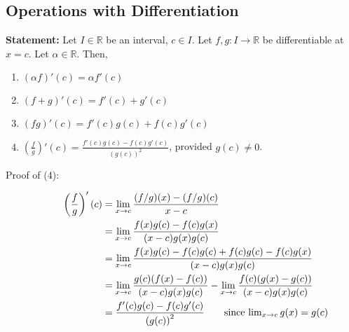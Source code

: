 \documentclass[10pt]{extarticle}
\newcommand{\R}{\mathbb{R}}
\begin{document}
  \subsection{Operations with Differentiation}%
    \textbf{Statement:} Let $I\in\R$ be an interval, $c\in I$. Let $f,g: I\rightarrow \R$ be differentiable at $x=c$. Let $\alpha\in\R$. Then,
    \begin{enumerate}[(1)]
      \item $\displaystyle(\alpha f)'(c) = \alpha f'(c)$
      \item $\displaystyle(f+g)'(c) = f'(c) + g'(c)$
      \item $\displaystyle(fg)'(c) = f'(c)g(c) + f(c)g'(c)$
      \item $\displaystyle\left(\frac{f}{g}\right)'(c) = \frac{f'(c)g(c)-f(c)g'(c)}{\left(g(c)\right)^2}$, provided $g(c) \neq 0$.
    \end{enumerate}

    \begin{description}
      \item[Proof of (4):]
        \begin{align*}
          \left(\frac{f}{g}\right)'(c) &=\lim_{x\rightarrow c} \frac{(f/g)(x) - (f/g)(c)}{x-c}\\
                                       &= \lim_{x\rightarrow c} \frac{f(x)g(c) - f(c)g(x)}{(x-c)g(x)g(c)}\\
                                       &= \lim_{x\rightarrow c}\frac{f(x)g(c)-f(c)g(c) + f(c)g(c) - f(c)g(x)}{(x-c)g(x)g(c)}\\
                                       &= \lim_{x\rightarrow c}\frac{g(c)(f(x) - f(c))}{(x-c)g(x)g(c)} - \lim_{x\rightarrow c}\frac{f(c)(g(x) - g(c))}{(x-c)g(x)g(c)}\\
                                       &= \frac{f'(c)g(c) - f(c)g'(c)}{\left(g(c)\right)^2} \tag*{since $\lim_{x\rightarrow c}g(x) = g(c)$}
        \end{align*}
    \end{description}
\end{document}
